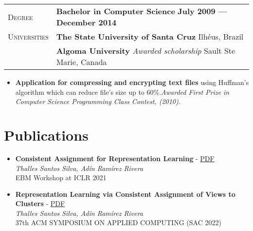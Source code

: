 \documentclass[9pt, a4paper, oneside, final]{scrartcl} %
\newcommand{\gray}{\rowcolor[gray]{.90}} %
\begin{document}
\begin{center}
\begin{tabularx}{1.0\linewidth}{>{\raggedleft\scshape}p{2.2cm}X}
\gray Degree & \textbf{Bachelor in Computer Science} \hfill \textbf{July 2009 --- December 2014}\\
\gray Universities & \textbf{The State University of Santa Cruz} \hfill Ilhéus, Brazil\\ 
\gray & \textbf{Algoma University} \textit{Awarded scholarship}  \hfill Sault Ste Marie, Canada\\
\end{tabularx}
\end{center}

\begin{itemize}\itemsep1.0pt \parskip0pt 

\item \textbf{Application for compressing and encrypting text files} using Huffman's algorithm which can reduce file’s size up to 60\%.\textit{Awarded First Prize in Computer Science Programming Class Contest, (2010)}.

\end{itemize}


\section{Publications}

\begin{itemize}

\item \textbf{Consistent Assignment for Representation Learning} - \href{https://openreview.net/forum?id=QNO8mhqNmJh}{PDF}
\\
\textit{Thalles Santos Silva, Adín Ramírez Rivera}\\
EBM Workshop at ICLR 2021

\item \textbf{Representation Learning via Consistent Assignment of Views to Clusters} - \href{https://arxiv.org/abs/2112.15421}{PDF}
\\
\textit{Thalles Santos Silva, Adín Ramírez Rivera}\\
37th ACM SYMPOSIUM ON APPLIED COMPUTING (SAC 2022)

\end{itemize} 
\end{document}
